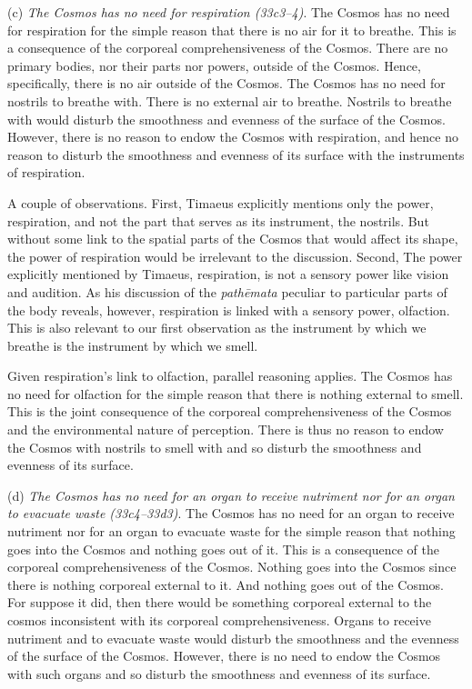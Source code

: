 (c) \emph{The Cosmos has no need for respiration (33c3--4)}. The Cosmos has no need for respiration for the simple reason that there is no air for it to breathe. This is a consequence of the corporeal comprehensiveness of the Cosmos. There are no primary bodies, nor their parts nor powers, outside of the Cosmos. Hence, specifically, there is no air outside of the Cosmos. The Cosmos has no need for nostrils to breathe with. There is no external air to breathe. Nostrils to breathe with would disturb the smoothness and evenness of the surface of the Cosmos. However, there is no reason to endow the Cosmos with respiration, and hence no reason to disturb the smoothness and evenness of its surface with the instruments of respiration.

A couple of observations. First, Timaeus explicitly mentions only the power, respiration, and not the part that serves as its instrument, the nostrils. But without some link to the spatial parts of the Cosmos that would affect its shape, the power of respiration would be irrelevant to the discussion. Second, The power explicitly mentioned by Timaeus, respiration, is not a sensory power like vision and audition. As his discussion of the \emph{pathēmata} peculiar to particular parts of the body reveals, however, respiration is linked with a sensory power, olfaction. This is also relevant to our first observation as the instrument by which we breathe is the instrument by which we smell.

Given respiration's link to olfaction, parallel reasoning applies. The Cosmos has no need for olfaction for the simple reason that there is nothing external to smell. This is the joint consequence of the corporeal comprehensiveness of the Cosmos and the environmental nature of perception. There is thus no reason to endow the Cosmos with nostrils to smell with and so disturb the smoothness and evenness of its surface.

(d) \emph{The Cosmos has no need for an organ to receive nutriment nor for an organ to evacuate waste (33c4--33d3)}. The Cosmos has no need for an organ to receive nutriment nor for an organ to evacuate waste for the simple reason that nothing goes into the Cosmos and nothing goes out of it. This is a consequence of the corporeal comprehensiveness of the Cosmos. Nothing goes into the Cosmos since there is nothing corporeal external to it. And nothing goes out of the Cosmos. For suppose it did, then there would be something corporeal external to the cosmos inconsistent with its corporeal comprehensiveness. Organs to receive nutriment and to evacuate waste would disturb the smoothness and the evenness of the surface of the Cosmos. However, there is no need to endow the Cosmos with such organs and so disturb the smoothness and evenness of its surface.

